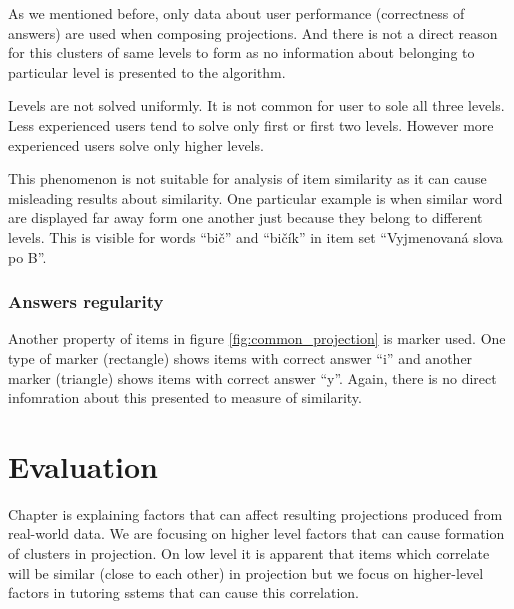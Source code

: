 \documentclass[
  digital, %
  table,   %
  nolof,     %
  nolot,     %
  nocover
]{fithesis3}
\begin{document}
As we mentioned before, only data about user performance (correctness of answers) are used when composing projections. And there is not a direct reason for this clusters of same levels to form as no information about belonging to particular level is presented to the algorithm.


Levels are not solved uniformly. It is not common for user to sole all three levels. Less experienced users tend to solve only first or first two levels. However more experienced users solve only higher levels.



This phenomenon is not suitable for analysis of item similarity as it can cause misleading results about similarity. One particular example is when similar word are displayed far away form one another just because they belong to different levels. This is visible for words ``bič'' and ``bičík'' in item set ``Vyjmenovaná slova po B''.

\subsection{Answers regularity}\label{answers-regularity}

Another property of items in figure \ref{fig:common_projection} is marker used. One type of marker (rectangle) shows items with correct answer ``i'' and another marker (triangle) shows items with correct answer ``y''. Again, there is no direct infomration about this presented to measure of similarity.


\chapter{Evaluation}


Chapter is explaining factors that can affect resulting projections produced from real-world data. We are focusing on higher level factors that can cause formation of clusters in projection. On low level it is apparent that items which correlate will be similar (close to each other) in projection but we focus on higher-level factors in tutoring sstems that can cause this correlation.
\end{document}
